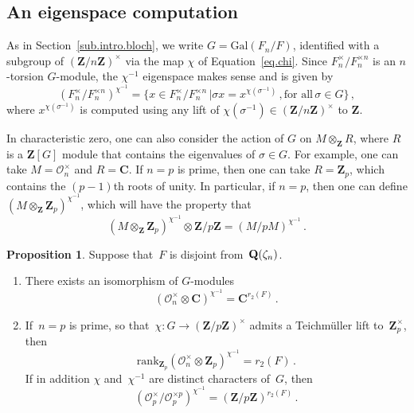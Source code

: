 \documentclass[12pt,reqno]{amsart}
\theoremstyle{definition}
\newtheorem{proposition}[theorem]{Proposition}
\def\Q{\mathbf Q}   %
\def\Z{\mathbf Z}   %
\def\C{\mathbf C}   %
\def\calO{\mathcal O}
\def\nn{n}
\def\Gal{\mathrm{Gal}}
\def\OL{\mathcal{O}}
\begin{document}
\subsection{An eigenspace computation}
\label{sub.eigenspace}

As in  Section~\ref{sub.intro.bloch}, we write $G=\Gal(F_\nn/F)$,
identified with a subgroup of $(\Z/\nn\Z)^\times$ via the map $\chi$ 
of Equation~\eqref{eq.chi}.
Since $F_\nn^\times/F_\nn^{\times \nn}$ is an $\nn$-torsion $G$-module, the 
$\chi^{-1}$ eigenspace makes sense and is given by
$$
\left(F_\nn^\times/F_\nn^{\times \nn}\right)^{\chi^{-1}}=
\{ x \in F_\nn^\times/F_\nn^{\times \nn} \, | \sigma x = x^{\chi(\sigma^{-1})} \,,
\text{for all} \, \sigma \in G \}\,,
$$
where $x^{\chi(\sigma^{-1})}$ is computed using any lift of 
$\chi(\sigma^{-1}) \in (\Z/\nn\Z)^\times$ to $\Z$.

In characteristic zero, one can also consider the action of $G$ on 
$M \otimes_\Z R$, where $R$ is a $\Z[G]$ module that contains the eigenvalues 
of $\sigma \in G$. For example, one can take $M=\calO_\nn^\times$ and $R=\C$.
If $\nn=p$ is prime, then one can take $R=\Z_p$, which contains the $(p-1)$th
roots of unity. In particular, if $\nn=p$, then one can define 
$\left(M \otimes_\Z \Z_p\right)^{\chi^{-1}}$, which will have the property that
$$
\left(M \otimes_\Z \Z_p\right)^{\chi^{-1}} \otimes \Z/p\Z = 
\left(M/pM\right)^{\chi^{-1}} \,.
$$

\begin{proposition}
\label{prop.calOm}
Suppose that~$F$ is disjoint from~$\Q(\z_\nn)$.
\begin{enumerate}[label=(\alph*)]
\item \label{parta.calOm}
There exists an isomorphism of $G$-modules
\begin{equation}
\label{eq.calOm}
\left(\calO_\nn^\times \otimes \C \right)^{\chi^{-1}} =\C^{r_2(F)} \,.
\end{equation}
\item \label{partb.calOm} If~$\nn=p$ is prime, so 
that~$\chi: G \rightarrow (\Z/p\Z)^\times$ admits a
Teichm\"{u}ller lift to~$\Z^{\times}_p$, then 
$$
\mathrm{rank}_{\Z_p} \left(\calO_\nn^\times \otimes \Z_p \right)^{\chi^{-1}}
=r_2(F)\,.
$$
If in addition $\chi$ and~$\chi^{-1}$ are distinct characters of~$G$, then
$$
\left(\OL_p^{\times}/\OL_p^{\times p}\right)^{\chi^{-1}} = 
\left(\Z/p\Z\right)^{r_2(F)} \,.
$$
\end{enumerate}
\end{proposition} 
\end{document}
